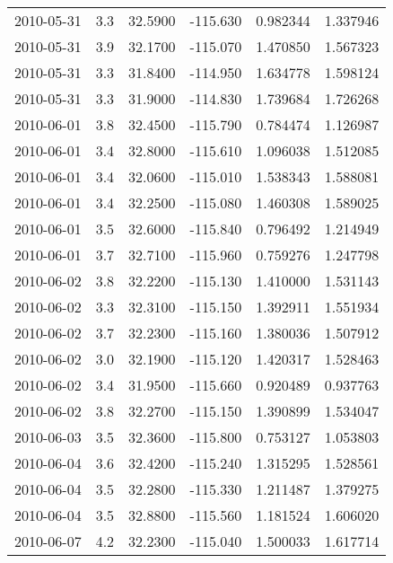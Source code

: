 \begin{tabular}{lrrrrr}
2010-05-31 &       3.3 &  32.5900 &  -115.630 &         0.982344 &         1.337946 \\
2010-05-31 &       3.9 &  32.1700 &  -115.070 &         1.470850 &         1.567323 \\
2010-05-31 &       3.3 &  31.8400 &  -114.950 &         1.634778 &         1.598124 \\
2010-05-31 &       3.3 &  31.9000 &  -114.830 &         1.739684 &         1.726268 \\
2010-06-01 &       3.8 &  32.4500 &  -115.790 &         0.784474 &         1.126987 \\
2010-06-01 &       3.4 &  32.8000 &  -115.610 &         1.096038 &         1.512085 \\
2010-06-01 &       3.4 &  32.0600 &  -115.010 &         1.538343 &         1.588081 \\
2010-06-01 &       3.4 &  32.2500 &  -115.080 &         1.460308 &         1.589025 \\
2010-06-01 &       3.5 &  32.6000 &  -115.840 &         0.796492 &         1.214949 \\
2010-06-01 &       3.7 &  32.7100 &  -115.960 &         0.759276 &         1.247798 \\
2010-06-02 &       3.8 &  32.2200 &  -115.130 &         1.410000 &         1.531143 \\
2010-06-02 &       3.3 &  32.3100 &  -115.150 &         1.392911 &         1.551934 \\
2010-06-02 &       3.7 &  32.2300 &  -115.160 &         1.380036 &         1.507912 \\
2010-06-02 &       3.0 &  32.1900 &  -115.120 &         1.420317 &         1.528463 \\
2010-06-02 &       3.4 &  31.9500 &  -115.660 &         0.920489 &         0.937763 \\
2010-06-02 &       3.8 &  32.2700 &  -115.150 &         1.390899 &         1.534047 \\
2010-06-03 &       3.5 &  32.3600 &  -115.800 &         0.753127 &         1.053803 \\
2010-06-04 &       3.6 &  32.4200 &  -115.240 &         1.315295 &         1.528561 \\
2010-06-04 &       3.5 &  32.2800 &  -115.330 &         1.211487 &         1.379275 \\
2010-06-04 &       3.5 &  32.8800 &  -115.560 &         1.181524 &         1.606020 \\
2010-06-07 &       4.2 &  32.2300 &  -115.040 &         1.500033 &         1.617714 \\

\end{tabular}
